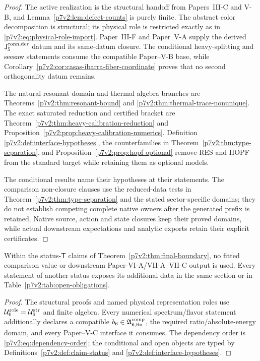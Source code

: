 \documentclass[11pt,a4paper]{article}
\newcommand{\Rconn}{\mathsf J_5^{\rm conn,der}}
\newcommand{\Ustr}{\mathcal U_6^{\rm str}}
\newcommand{\Urole}{\mathcal U_6^{\rm role}}
\newcommand{\Acompsix}{\mathfrak A_{6,{\rm fin}}^{\rm comp}}
\begin{document}
\begin{proof}
The active realization is the structural handoff from Papers~III-C and V-B,
and Lemma~\ref{p7v2:lem:defect-counts} is purely finite.  The abstract color
decomposition is structural; its physical role is restricted exactly as in
\eqref{p7v2:eq:physical-role-import}.  Paper~III-F and Paper~V-A supply the
derived \(\Rconn\) datum and its same-datum closure.  The conditional heavy-splitting and
seesaw statements consume the compatible Paper--V-B base, while
Corollary~\ref{p7v2:cor:casas-ibarra-fiber-coordinate} proves that no second
orthogonality datum remains.

The natural resonant domain and thermal algebra branches are
Theorems~\ref{p7v2:thm:resonant-bound} and
\ref{p7v2:thm:thermal-trace-nonunique}.  The exact saturated reduction and
certified bracket are Theorem~\ref{p7v2:thm:heavy-calibration-reduction} and
Proposition~\ref{p7v2:prop:heavy-calibration-numerics}.  Definition
\ref{p7v2:def:interface-hypotheses}, the counterfamilies in
Theorem~\ref{p7v2:thm:type-separation}, and
Proposition~\ref{p7v2:prop:hopf-optional} remove RES and HOPF from the standard
target while retaining them as optional models.

The conditional results name their hypotheses at their statements.  The
comparison non-closure clauses use the reduced-data tests in
Theorem~\ref{p7v2:thm:type-separation} and the stated sector-specific domains;
they do not establish competing complete native owners after the generated
prefix is retained.  Native source, action and state closures keep their
proved domains, while actual downstream expectations and analytic exports
retain their explicit certificates.
\end{proof}

\begin{corollary}
\label{p7v2:cor:no-hidden-valid}
Within the status-\(\mathsf T\) claims of
Theorem~\ref{p7v2:thm:final-boundary}, no fitted comparison value or downstream
Paper-VI-A/VII-A--VII-C output is used.  Every statement of another status exposes
its additional data in the same section or in
Table~\ref{p7v2:tab:open-obligations}.
\end{corollary}

\begin{proof}
The structural proofs and named physical representation roles use
\(\Urole=\Ustr\) and finite algebra.  Every numerical spectrum/flavor statement
additionally declares a compatible \(b_6\in\Acompsix\), the required
ratio/absolute-energy domain, and every Paper--V-C interface it consumes.  The dependency order is
\eqref{p7v2:eq:dependency-order}; the conditional and open objects are typed by
Definitions~\ref{p7v2:def:claim-status} and
\ref{p7v2:def:interface-hypotheses}.
\end{proof}
\end{document}

